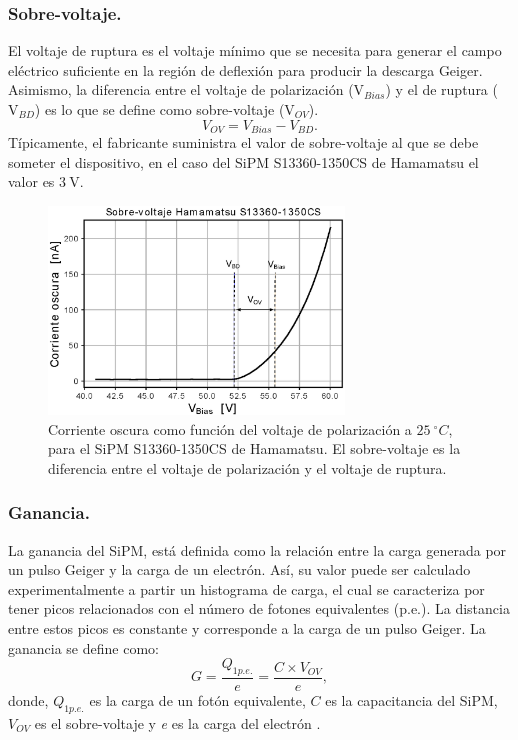 \subsubsection{Sobre-voltaje.}
El voltaje de ruptura es el voltaje mínimo que se necesita para generar el campo eléctrico suficiente en la región de deflexión  para producir la descarga Geiger. Asimismo, la diferencia entre el voltaje de polarización ($\mbox{V}_{Bias}$) y el de ruptura ($\mbox{V}_{BD}$) es lo que se define como sobre-voltaje ($\mbox{V}_{OV}$).
\begin{equation}
V_{OV} = V_{Bias}-V_{BD}.
\label{Vbd_equation}    
\end{equation}
Típicamente, el fabricante suministra el valor de sobre-voltaje al que se debe someter el dispositivo, en el caso del SiPM S13360-1350CS de Hamamatsu el valor es $ 3~\mbox{V}$.
\begin{figure}[h!]
\begin{centering}
  \includegraphics[width=0.7\textwidth]{Images/overvoltaje.eps}
    \caption{Corriente oscura como función del voltaje de polarización a $25~^\circ C$, para el SiPM  S13360-1350CS de Hamamatsu. El sobre-voltaje es la diferencia entre el voltaje de polarización y el voltaje de ruptura.}
    \label{fig:Overvoltage}  
  \par\end{centering}
\end{figure}
\subsubsection{Ganancia.}
La ganancia del SiPM, está definida como la relación entre la carga generada por un pulso Geiger y la carga de un electrón. Así, su valor puede ser calculado experimentalmente a partir un histograma de carga, el cual se caracteriza por tener picos relacionados con el número de fotones equivalentes (p.e.). La distancia entre estos picos es constante  y corresponde a la carga de un pulso  Geiger. La ganancia se define como: %
\begin{equation}
    G=\frac{Q_{1p.e.}}{e} = \frac{C\times V_{OV}}{e},
    \label{Gain_eq}
\end{equation}
donde, $Q_{1p.e.}$ es la carga de un fotón equivalente, $C$ es la capacitancia del SiPM, $V_{OV}$ es el sobre-voltaje y \textit{e} es la carga del electrón \citep{Intro_SIPM_Sensl}.
